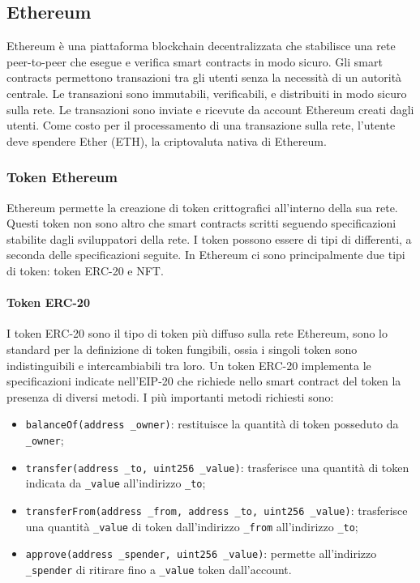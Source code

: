 \documentclass[a4paper]{article}
\begin{document}
    \subsection{Ethereum}
    Ethereum è una piattaforma blockchain decentralizzata che stabilisce una rete peer-to-peer che esegue e verifica smart contracts in modo sicuro.
    Gli smart contracts permettono transazioni tra gli utenti senza la necessità di un autorità centrale.
    Le transazioni sono immutabili, verificabili, e distribuiti in modo sicuro sulla rete. Le transazioni sono inviate e ricevute da account Ethereum creati dagli utenti.
    Come costo per il processamento di una transazione sulla rete, l'utente deve spendere Ether (ETH), la criptovaluta nativa di Ethereum\cite{ethereum}.
    \subsubsection{Token Ethereum}
    Ethereum permette la creazione di token crittografici all'interno della sua rete. Questi token non sono altro che smart contracts scritti seguendo specificazioni stabilite
    dagli sviluppatori della rete. I token possono essere di tipi di differenti, a seconda delle specificazioni seguite. In Ethereum ci sono principalmente due tipi di token: token ERC-20 e NFT.
    \paragraph{Token ERC-20}
    I token ERC-20 sono il tipo di token più diffuso sulla rete Ethereum, sono lo standard per la definizione di token fungibili\cite{erc20}, ossia i singoli token sono indistinguibili e intercambiabili tra loro.
    Un token ERC-20 implementa le specificazioni indicate nell'EIP-20 che richiede nello smart contract del token la presenza di diversi metodi. I più importanti metodi richiesti sono:
    \begin{itemize}
      \item \verb|balanceOf(address _owner)|: restituisce la quantità di token posseduto da \verb|_owner|;
      \item \verb|transfer(address _to, uint256 _value)|: trasferisce una quantità di token indicata da \verb|_value| all'indirizzo \verb|_to|;
      \item \verb|transferFrom(address _from, address _to, uint256 _value)|: trasferisce una quantità \verb|_value| di token dall'indirizzo \verb|_from| all'indirizzo \verb|_to|;
      \item \verb|approve(address _spender, uint256 _value)|: permette all'indirizzo \verb|_spender| di ritirare fino a \verb|_value| token dall'account\cite{eip20}.
    \end{itemize}
\end{document}
